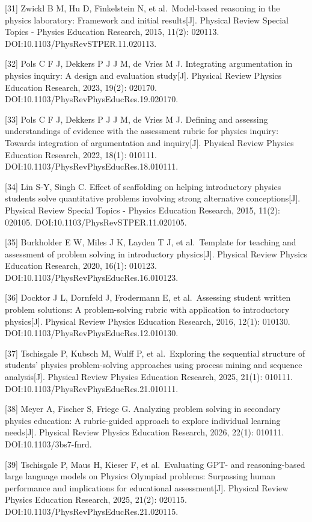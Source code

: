 \documentclass[
  12pt,
  a4paper]{ctexbook}
\begin{document}
{[}31{]} Zwickl B M, Hu D, Finkelstein N, et al.~Model-based reasoning
in the physics laboratory: Framework and initial results{[}J{]}.
Physical Review Special Topics - Physics Education Research, 2015,
11(2): 020113. DOI:10.1103/PhysRevSTPER.11.020113.

{[}32{]} Pols C F J, Dekkers P J J M, de Vries M J. Integrating
argumentation in physics inquiry: A design and evaluation study{[}J{]}.
Physical Review Physics Education Research, 2023, 19(2): 020170.
DOI:10.1103/PhysRevPhysEducRes.19.020170.

{[}33{]} Pols C F J, Dekkers P J J M, de Vries M J. Defining and
assessing understandings of evidence with the assessment rubric for
physics inquiry: Towards integration of argumentation and
inquiry{[}J{]}. Physical Review Physics Education Research, 2022, 18(1):
010111. DOI:10.1103/PhysRevPhysEducRes.18.010111.

{[}34{]} Lin S-Y, Singh C. Effect of scaffolding on helping introductory
physics students solve quantitative problems involving strong
alternative conceptions{[}J{]}. Physical Review Special Topics - Physics
Education Research, 2015, 11(2): 020105.
DOI:10.1103/PhysRevSTPER.11.020105.

{[}35{]} Burkholder E W, Miles J K, Layden T J, et al.~Template for
teaching and assessment of problem solving in introductory
physics{[}J{]}. Physical Review Physics Education Research, 2020, 16(1):
010123. DOI:10.1103/PhysRevPhysEducRes.16.010123.

{[}36{]} Docktor J L, Dornfeld J, Frodermann E, et al.~Assessing student
written problem solutions: A problem-solving rubric with application to
introductory physics{[}J{]}. Physical Review Physics Education Research,
2016, 12(1): 010130. DOI:10.1103/PhysRevPhysEducRes.12.010130.

{[}37{]} Tschisgale P, Kubsch M, Wulff P, et al.~Exploring the
sequential structure of students' physics problem-solving approaches
using process mining and sequence analysis{[}J{]}. Physical Review
Physics Education Research, 2025, 21(1): 010111.
DOI:10.1103/PhysRevPhysEducRes.21.010111.

{[}38{]} Meyer A, Fischer S, Friege G. Analyzing problem solving in
secondary physics education: A rubric-guided approach to explore
individual learning needs{[}J{]}. Physical Review Physics Education
Research, 2026, 22(1): 010111. DOI:10.1103/3bs7-fnrd.

{[}39{]} Tschisgale P, Maus H, Kieser F, et al.~Evaluating GPT- and
reasoning-based large language models on Physics Olympiad problems:
Surpassing human performance and implications for educational
assessment{[}J{]}. Physical Review Physics Education Research, 2025,
21(2): 020115. DOI:10.1103/PhysRevPhysEducRes.21.020115.

\backmatter
\end{document}

